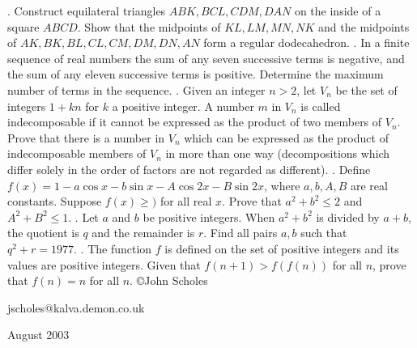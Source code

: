 \nopagenumbers
{}
\vskip 25pt
. Construct equilateral triangles $ABK, BCL, CDM, DAN$ on the inside of a square $ABCD$. Show that the midpoints of $KL,LM,MN,NK$ and the midpoints of $AK,BK,BL,CL,CM,DM,DN,AN$ form a regular dodecahedron.
\vskip 12pt
. In a finite sequence of real numbers the sum of any seven successive terms is negative, and the sum of any eleven successive terms is positive. Determine the maximum number of terms in the sequence.
\vskip 12pt
. Given an integer $n>2$, let $V_n$ be the set of integers $1+kn$ for $k$ a positive integer. A number $m$ in $V_n$ is called indecomposable if it cannot be expressed as the product of two members of $V_n$. Prove that there is a number in $V_n$ which can be expressed as the product of indecomposable members of $V_n$ in more than one way (decompositions which differ solely in the order of factors are not regarded as different).
\vskip 12pt
. Define $f(x)=1-a\cos x-b\sin x-A\cos2x-B\sin2x$, where $a,b,A,B$ are real constants. Suppose $f(x)\ge)$ for all real $x$. Prove that $a^2+b^2\le2$ and $A^2+B^2\le1$.
\vskip 12pt
. Let $a$ and $b$ be positive integers. When $a^2+b^2$ is divided by $a+b$, the quotient is $q$ and the remainder is $r$. Find all pairs $a,b$ such that $q^2+r=1977$.
\vskip 12pt
. The function $f$ is defined on the set of positive integers and its values are positive integers. Given that $f(n+1)>f(f(n))$ for all $n$, prove that $f(n)=n$ for all $n$.
\vskip 20pt
\noindent \copyright John Scholes

\noindent jscholes@kalva.demon.co.uk

 August 2003

\bye
